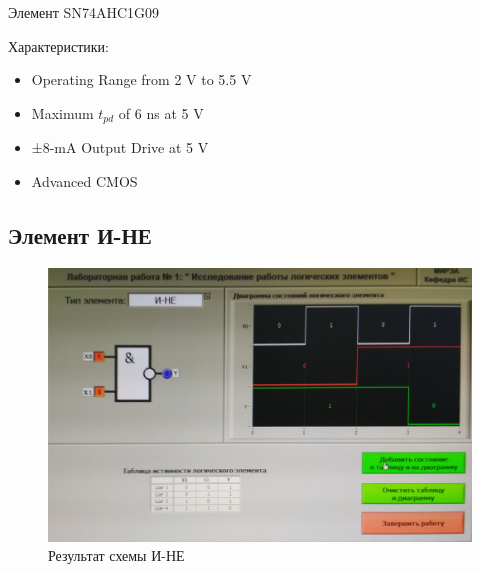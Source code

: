 Элемент SN74AHC1G09
 
Характеристики:
\begin{itemize}
	\item Operating Range from 2 V to 5.5 V
	\item Maximum $t_{pd}$ of 6 ns at 5 V
	\item ±8-mA Output Drive at 5 V
	\item Advanced CMOS 
\end{itemize}

\subsection{Элемент И-НЕ}

\begin{figure}[H]
	\centering
	\includegraphics[width=0.85\linewidth]{imgs/1/and-not}
	\caption{Результат схемы И-НЕ}
	\label{fig:1_and-not}
\end{figure}


